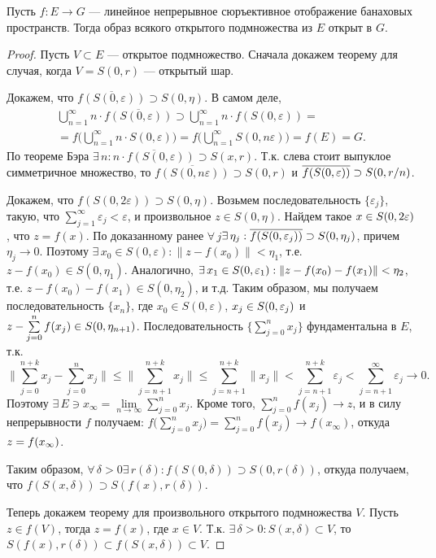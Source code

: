 \documentclass[10pt,titlepage, a4paper]{article}
\begin{document}
\begin{theorem}
Пусть $f\colon E\to G$ --- линейное непрерывное сюръективное
отображение банаховых пространств. Тогда образ всякого открытого
подмножества из $E$ открыт в $G$.
\end{theorem}

\begin{proof}
Пусть $V\subset E$ --- открытое подмножество. Сначала докажем
теорему для случая, когда $V=S(0,r)$ --- открытый шар.

Докажем, что $\overline{f(S(0,\varepsilon))}\supset S(0,\eta)$. В
самом деле,
\begin{multline*}
\bigcup\limits_{n=1}^\infty
n\cdot\overline{f(S(0,\varepsilon))}\supset\bigcup\limits_{n=1}^\infty
n\cdot f(S(0,\varepsilon))=\\= f\Big(\bigcup\limits_{n=1}^\infty
n\cdot S(0,\varepsilon)\Big)=f\Big(\bigcup\limits_{n=1}^\infty
S(0,n\varepsilon)\Big)=f(E)=G.
\end{multline*}
По теореме Бэра $\exists\,n:\overline{n\cdot
f(S(0,\varepsilon))}\supset S(x,r)$. Т.к. слева стоит выпуклое
симметричное множество, то $\overline{f(S(0,n\varepsilon))}\supset
S(0,r)$ и $\overline{f(S(0,\varepsilon))}\p\supset S(0,r/n)$.

Докажем, что $f(S(0,2\varepsilon))\supset S(0,\eta)$. Возьмем
последовательность $\{\varepsilon_j\}$, такую, что
$\sum\limits_{j=1}^\infty \varepsilon_j<\varepsilon$, и произвольное
$z\in S(0,\eta)$. Найдем такое $x\p\in S(0,2\varepsilon)$, что
$z=f(x)$. По доказанному ранее
$\forall\,j$\;\;$\exists\,\eta_j:\overline{f(S(0,\varepsilon_j))}\p\supset
S(0,\eta_j)$, причем $\eta_j\to 0$. Поэтому $\exists\,x_0\in
S(0,\varepsilon): \|z-f(x_0)\|<\eta_1$, т.е. $z-f(x_0)\in
S(0,\eta_1)$. Аналогично, $\exists\,x_1\in
S(0,\varepsilon_1):\|z-f(x_0)-f(x_1)\|\p<\eta_2$, т.е.
$z-f(x_0)-f(x_1)\in S(0,\eta_2)$, и т.д. Таким образом, мы получаем
последовательность $\{x_n\}$, где $x_0\in S(0,\varepsilon)$,
$x_j\p\in S(0,\varepsilon_j)$ и $z-\sum\limits_{j=0}^nf(x_j)\p\in
S(0,\eta_{n+1})$. Последовательность $\Big\{\sum\limits_{j=0}^n
x_j\Big\}$ фундаментальна в $E$, т.к.
$$\Big\|\sum\limits_{j=0}^{n+k}x_j-\sum\limits_{j=0}^n x_j\Big\|\leqslant
\Big\|\sum\limits_{j=n+1}^{n+k}x_j\Big\|\leqslant\sum\limits_{j=n+1}^{n+k}\|x_j\|
<\sum\limits_{j=n+1}^{n+k}\varepsilon_j<\sum\limits_{j=n+1}^\infty
\varepsilon_j\to 0.$$ Поэтому $\exists\,E\ni
x_\infty=\lim\limits_{n\to\infty}\sum\limits_{j=0}^n x_j$. Кроме
того, $\sum\limits_{j=0}^nf(x_j)\to z$, и в силу непрерывности $f$
получаем: $f\Big(\sum\limits_{j=0}^n
x_j\Big)=\sum\limits_{j=0}^nf(x_j)\to f(x_\infty)$, откуда
$z\p=f(x_\infty)$.

Таким образом,
$\forall\,\delta>0$\;\;$\exists\,r(\delta):f(S(0,\delta))\supset
S(0,r(\delta))$, откуда получаем, что $f(S(x,\delta))\supset
S(f(x),r(\delta))$.

Теперь докажем теорему для произвольного открытого подмножества $V$.
Пусть $z\in f(V)$, тогда $z=f(x)$, где $x\in V$. Т.к.
$\exists\,\delta>0:S(x,\delta)\subset V$, то
$S(f(x),r(\delta))\subset f(S(x,\delta))\subset V$.
\end{proof}
\end{document}
